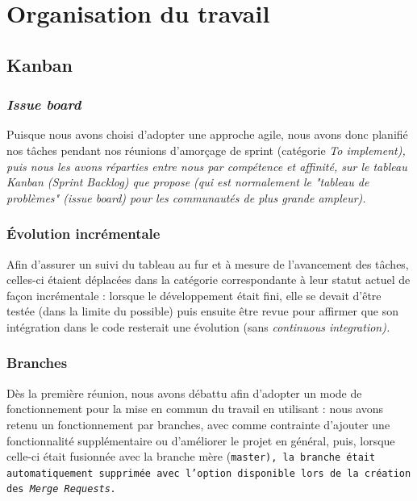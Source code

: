 \documentclass[a4paper, 12pt]{report}
\newcommand{\tech}[1]{\sf{#1}}
\newcommand{\gl}{\tech{GitLab}}
\newcommand{\en}[1]{\it{#1}}
\begin{document}
    
    \chapter{Organisation du travail} %
    
    \section{Kanban}
    
    \subsection{\en{Issue board}}
    
    Puisque nous avons choisi d'adopter une approche agile, nous avons donc planifié nos tâches pendant nos réunions d'amorçage de sprint (catégorie \en{To implement}), puis nous les avons réparties entre nous par compétence et affinité, sur le tableau Kanban (\en{Sprint Backlog}) que propose \gl{} (qui est normalement le "tableau de problèmes" (\en{issue board}) pour les communautés de plus grande ampleur).
    
    \subsection{\'Evolution incrémentale}
    
    Afin d'assurer un suivi du tableau au fur et à mesure de l'avancement des tâches, celles-ci étaient déplacées dans la catégorie correspondante à leur statut actuel de façon incrémentale : lorsque le développement était fini, elle se devait d'être testée (dans la limite du possible) puis ensuite être revue pour affirmer que son intégration dans le code resterait une évolution (sans \en{continuous integration}).
    
    \subsection{Branches}
    
    Dès la première réunion, nous avons débattu afin d'adopter un mode de fonctionnement pour la mise en commun du travail en utilisant \gl{} : nous avons retenu un fonctionnement par branches, avec comme contrainte d'ajouter une fonctionnalité supplémentaire ou d'améliorer le projet en général, puis, lorsque celle-ci était fusionnée avec la branche mère (\tt{master}), la branche était automatiquement supprimée avec l'option disponible lors de la création des \en{Merge Requests}.
    
\end{document}
